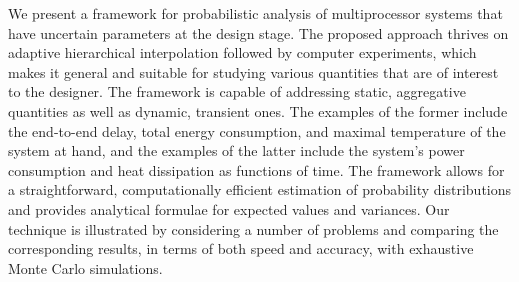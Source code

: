 We present a framework for probabilistic analysis of multiprocessor systems that
have uncertain parameters at the design stage. The proposed approach thrives on
adaptive hierarchical interpolation followed by computer experiments, which
makes it general and suitable for studying various quantities that are of
interest to the designer. The framework is capable of addressing static,
aggregative quantities as well as dynamic, transient ones. The examples of the
former include the end-to-end delay, total energy consumption, and maximal
temperature of the system at hand, and the examples of the latter include the
system's power consumption and heat dissipation as functions of time. The
framework allows for a straightforward, computationally efficient estimation of
probability distributions and provides analytical formulae for expected values
and variances. Our technique is illustrated by considering a number of problems
and comparing the corresponding results, in terms of both speed and accuracy,
with exhaustive Monte Carlo simulations.
